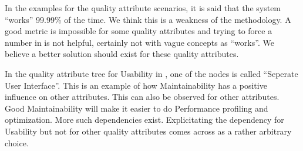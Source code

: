 \documentclass[a4paper,11pt]{report}
\begin{document}
In the examples for the quality attribute scenarios, it is said that the system ``works'' 99.99\% of the time. We think this is a weakness of the methodology. A good metric is impossible for some quality attributes and trying to force a number in is not helpful, certainly not with vague concepts as ``works''. We believe a better solution should exist for these quality attributes.

In the quality attribute tree for Usability in \cite{citeulike:174301}, one of the nodes is called ``Seperate User Interface''. This is an example of how Maintainability has a positive influence on other attributes. This can also be observed for other attributes. Good Maintainability will make it easier to do Performance profiling and optimization. More such dependencies exist. Explicitating the dependency for Usability but not for other quality attributes comes across as a rather arbitrary choice.

\nocite{1202957}
\nocite{citeulike:174301}
\nocite{yskout}
\nocite{Avgeriou2005}
\nocite{citeulike:171548}


\end{document}
